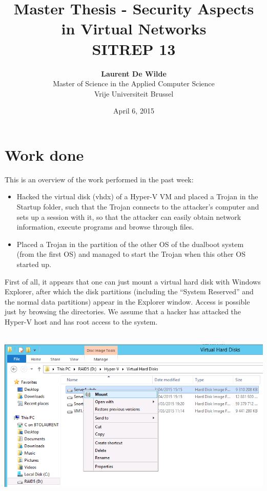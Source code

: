 \documentclass[11pt, a4paper]{article}
\title{Master Thesis -  Security Aspects in Virtual Networks\\ \textbf{SITREP 13}}
\author{\textbf{Laurent De Wilde} \\ Master of Science in the Applied Computer Science \\ Vrije Universiteit Brussel}
\date{April 6, 2015}
\begin{document}
\maketitle

\section*{Work done}

This is an overview of the work performed in the past week:
\begin{itemize}
\item Hacked the virtual disk (vhdx) of a Hyper-V VM and placed a Trojan in the Startup folder, such that the Trojan connects to the attacker's computer and sets up a session with it, so that the attacker can easily obtain network information, execute programs and browse through files.
\item Placed a Trojan in the partition of the other OS of the dualboot system (from the first OS) and managed to start the Trojan when this other OS started up.
\end{itemize}
First of all, it appears that one can just mount a virtual hard disk with Windows Explorer, after which the disk partitions (including the ``System Reserved'' and the normal data partitions) appear in the Explorer window. Access is possible just by browsing the directories. We assume that a hacker has attacked the Hyper-V host and has root access to the system.
$\;$ \\ \\
\noindent\begin{minipage}{\textwidth}
    \centering
    \includegraphics[width=\textwidth]{Mount_1.png}
\end{minipage}
\end{document}
